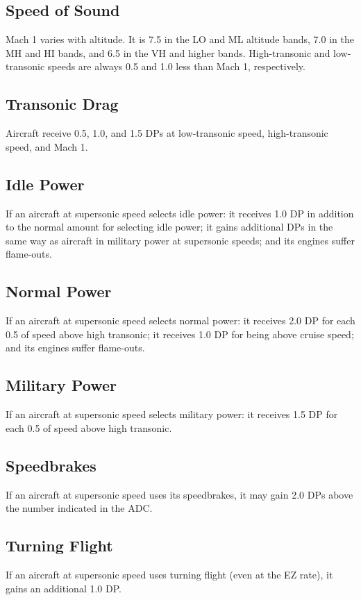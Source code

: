 \documentclass[10pt]{article}
\begin{document}
\subsection{Speed of Sound} Mach 1 varies with altitude. It is 7.5 in the LO and ML altitude bands, 7.0 in the MH and HI bands, and 6.5 in the VH and higher bands. High-transonic and low-transonic speeds are always 0.5 and 1.0 less than Mach 1, respectively.

\subsection{Transonic Drag} Aircraft receive 0.5, 1.0, and 1.5 DPs at low-transonic speed, high-transonic speed, and Mach 1.

\subsection{Idle Power} If an aircraft at supersonic speed selects idle power: it receives 1.0 DP in addition to the normal amount for selecting idle power; it gains additional DPs in the same way as aircraft in military power at supersonic speeds; and its engines suffer flame-outs.

\subsection{Normal Power} If an aircraft at supersonic speed selects normal power: it receives 2.0 DP for each 0.5 of speed above high transonic; it receives 1.0 DP for being above cruise speed; and its engines suffer flame-outs.

\subsection{Military Power} If an aircraft at supersonic speed selects military power: it receives 1.5 DP for each 0.5 of speed above high transonic.

\subsection{Speedbrakes} If an aircraft at supersonic speed uses its speedbrakes, it may gain 2.0 DPs above the number indicated in the ADC.

\subsection{Turning Flight} If an aircraft at supersonic speed uses turning flight (even at the EZ rate), it gains an additional 1.0 DP.
\end{document}
